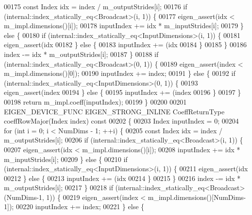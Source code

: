 \begin{DoxyCode}
00175       \textcolor{keyword}{const} Index idx = index / m\_outputStrides[i];
00176       \textcolor{keywordflow}{if} (internal::index\_statically\_eq<Broadcast>(i, 1)) \{
00177         eigen\_assert(idx < m\_impl.dimensions()[i]);
00178         inputIndex += idx * m\_inputStrides[i];
00179       \} \textcolor{keywordflow}{else} \{
00180         \textcolor{keywordflow}{if} (internal::index\_statically\_eq<InputDimensions>(i, 1)) \{
00181           eigen\_assert(idx %
00182         \} \textcolor{keywordflow}{else} \{
00183           inputIndex += (idx %
00184         \}
00185       \}
00186       index -= idx * m\_outputStrides[i];
00187     \}
00188     \textcolor{keywordflow}{if} (internal::index\_statically\_eq<Broadcast>(0, 1)) \{
00189       eigen\_assert(index < m\_impl.dimensions()[0]);
00190       inputIndex += index;
00191     \} \textcolor{keywordflow}{else} \{
00192       \textcolor{keywordflow}{if} (internal::index\_statically\_eq<InputDimensions>(0, 1)) \{
00193         eigen\_assert(index %
00194       \} \textcolor{keywordflow}{else} \{
00195         inputIndex += (index %
00196       \}
00197     \}
00198     \textcolor{keywordflow}{return} m\_impl.coeff(inputIndex);
00199   \}
00200 
00201   EIGEN\_DEVICE\_FUNC EIGEN\_STRONG\_INLINE CoeffReturnType coeffRowMajor(Index index)\textcolor{keyword}{ const}
00202 \textcolor{keyword}{  }\{
00203     Index inputIndex = 0;
00204     \textcolor{keywordflow}{for} (\textcolor{keywordtype}{int} i = 0; i < NumDims - 1; ++i) \{
00205       \textcolor{keyword}{const} Index idx = index / m\_outputStrides[i];
00206       \textcolor{keywordflow}{if} (internal::index\_statically\_eq<Broadcast>(i, 1)) \{
00207         eigen\_assert(idx < m\_impl.dimensions()[i]);
00208         inputIndex += idx * m\_inputStrides[i];
00209       \} \textcolor{keywordflow}{else} \{
00210         \textcolor{keywordflow}{if} (internal::index\_statically\_eq<InputDimensions>(i, 1)) \{
00211           eigen\_assert(idx %
00212         \} \textcolor{keywordflow}{else} \{
00213           inputIndex += (idx %
00214         \}
00215       \}
00216       index -= idx * m\_outputStrides[i];
00217     \}
00218     \textcolor{keywordflow}{if} (internal::index\_statically\_eq<Broadcast>(NumDims-1, 1)) \{
00219       eigen\_assert(index < m\_impl.dimensions()[NumDims-1]);
00220       inputIndex += index;
00221     \} \textcolor{keywordflow}{else} \{

\end{DoxyCode}
